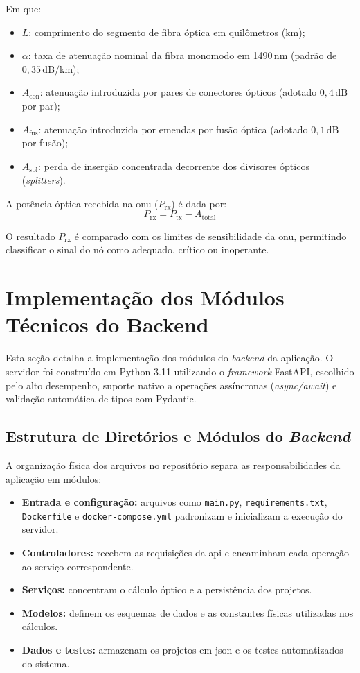 Em que:
\begin{itemize}
    \item $L$: comprimento do segmento de fibra óptica em quilômetros ($\text{km}$);
    \item $\alpha$: taxa de atenuação nominal da fibra monomodo em 1490\,nm (padrão de $0{,}35\,\text{dB/km}$);
    \item $A_{\text{con}}$: atenuação introduzida por pares de conectores ópticos (adotado $0{,}4\,\text{dB}$ por par);
    \item $A_{\text{fus}}$: atenuação introduzida por emendas por fusão óptica (adotado $0{,}1\,\text{dB}$ por fusão);
    \item $A_{\text{spl}}$: perda de inserção concentrada decorrente dos divisores ópticos (\textit{splitters}).
\end{itemize}

A potência óptica recebida na \gls{onu} ($P_{\text{rx}}$) é dada por:
\begin{equation}
\label{eq:potencia_recebida}
P_{\text{rx}} = P_{\text{tx}} - A_{\text{total}}
\end{equation}

O resultado $P_{\text{rx}}$ é comparado com os limites de sensibilidade da \gls{onu}, permitindo classificar o sinal do nó como adequado, crítico ou inoperante.

\section{Implementação dos Módulos Técnicos do Backend}
\label{sec:modulos_backend}

Esta seção detalha a implementação dos módulos do \textit{backend} da aplicação. O servidor foi construído em Python 3.11 utilizando o \textit{framework} FastAPI, escolhido pelo alto desempenho, suporte nativo a operações assíncronas (\textit{async/await}) e validação automática de tipos com Pydantic.

\subsection{Estrutura de Diretórios e Módulos do \textit{Backend}}

A organização física dos arquivos no repositório separa as responsabilidades da aplicação em módulos:
\begin{itemize}
    \item \textbf{Entrada e configuração:} arquivos como \texttt{main.py}, \texttt{requirements.txt}, \texttt{Dockerfile} e \texttt{docker-compose.yml} padronizam e inicializam a execução do servidor.
    \item \textbf{Controladores:} recebem as requisições da \gls{api} e encaminham cada operação ao serviço correspondente.
    \item \textbf{Serviços:} concentram o cálculo óptico e a persistência dos projetos.
    \item \textbf{Modelos:} definem os esquemas de dados e as constantes físicas utilizadas nos cálculos.
    \item \textbf{Dados e testes:} armazenam os projetos em \gls{json} e os testes automatizados do sistema.
\end{itemize}

